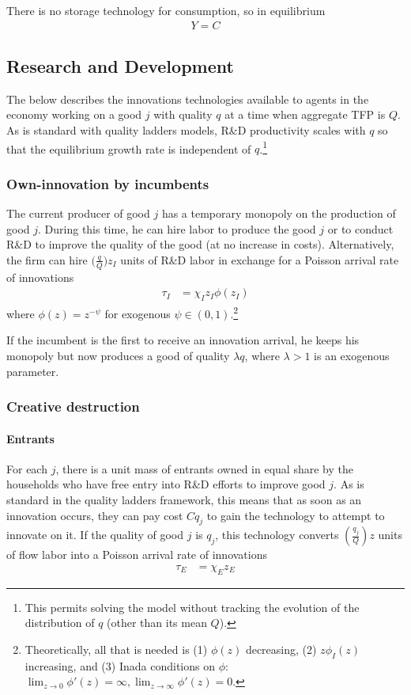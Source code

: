 \documentclass[12pt,english]{article}
\theoremstyle{remark}
\begin{document}
There is no storage technology for consumption, so in equilibrium 
\begin{align*}
Y = C
\end{align*}

\subsection{Research and Development}

The below describes the innovations technologies available to agents in the economy working on a good $j$ with quality $q$ at a time when aggregate TFP is $Q$. As is standard with quality ladders models, R\&D productivity scales with $q$ so that the equilibrium growth rate is independent of $q$.\footnote{This permits solving the model without tracking the evolution of the distribution of $q$ (other than its mean $Q$).}

\subsubsection{Own-innovation by incumbents}

The current producer of good $j$ has a temporary monopoly on the production of good $j$. During this time, he can hire labor to produce the good $j$ or to conduct R\&D to improve the quality of the good (at no increase in costs). Alternatively, the firm can hire $\big(\frac{q}{Q}\big)z_I$ units of R\&D labor in exchange for a Poisson arrival rate of innovations
\begin{align}
\tau_I &= \chi_I z_I \phi(z_I)  \label{incumbent_innovation_rate}
\end{align}
where $\phi(z) = z^{-\psi}$ for exogenous $\psi \in (0,1)$.\footnote{Theoretically, all that is needed is (1) $\phi(z)$ decreasing, (2) $z\phi_I(z)$ increasing, and (3) Inada conditions on $\phi$: $\lim_{z \to 0} \phi'(z) = \infty, \lim_{z \to \infty} \phi'(z) = 0$.}

If the incumbent is the first to receive an innovation arrival, he keeps his monopoly but now produces a good of quality $\lambda q$, where $\lambda > 1$ is an exogenous parameter. 

\subsubsection{Creative destruction}

\paragraph{Entrants} For each $j$, there is a unit mass of entrants owned in equal share by the households who have free entry into R\&D efforts to improve good $j$. As is standard in the quality ladders framework, this means that as soon as an innovation occurs, they can pay cost $Cq_j$ to gain the technology to attempt to innovate on it. If the quality of good $j$ is $q_j$, this technology converts $(\frac{q_j}{Q}) z$ units of flow labor into a Poisson arrival rate of innovations
\begin{align}
	\tau_E &= \chi_E z_E \label{simplified_entrant_innovation_rate}
\end{align}
\end{document}
